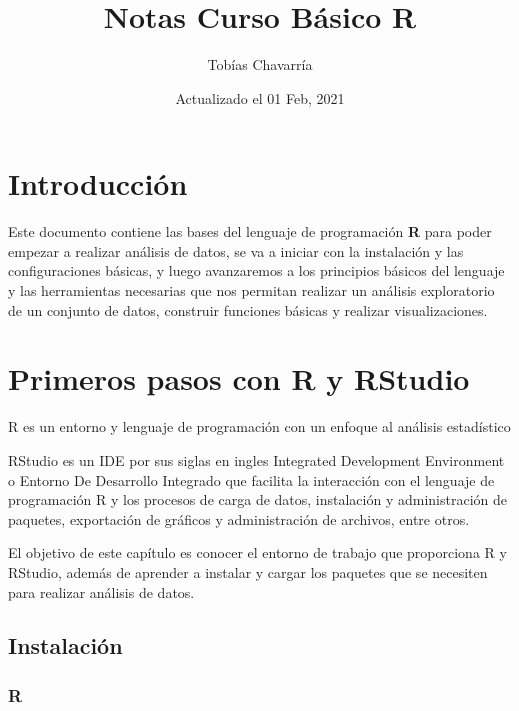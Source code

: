 \documentclass[
  12pt,
]{book}
\title{Notas Curso Básico R}
\author{Tobías Chavarría}
\date{Actualizado el 01 Feb, 2021}
\begin{document}
\maketitle

{
\hypersetup{linkcolor=}
\setcounter{tocdepth}{4}
\tableofcontents
}
\hypertarget{introducciuxf3n}{%
\chapter{Introducción}\label{introducciuxf3n}}

Este documento contiene las bases del lenguaje de programación \textbf{R} para poder
empezar a realizar análisis de datos, se va a iniciar con la instalación y las
configuraciones básicas, y luego avanzaremos a los principios básicos del
lenguaje y las herramientas necesarias que nos permitan realizar un análisis
exploratorio de un conjunto de datos, construir funciones básicas y realizar visualizaciones.

\hypertarget{primeros-pasos-con-r-y-rstudio}{%
\chapter{\texorpdfstring{\textbf{Primeros pasos con R y RStudio}}{Primeros pasos con R y RStudio}}\label{primeros-pasos-con-r-y-rstudio}}

R es un entorno y lenguaje de programación con un enfoque al análisis estadístico

RStudio es un IDE por sus siglas en ingles Integrated Development Environment o Entorno De Desarrollo Integrado que facilita la interacción con el lenguaje de programación R y los procesos de carga de datos, instalación y administración de paquetes, exportación de gráficos y administración de archivos, entre otros.

El objetivo de este capítulo es conocer el entorno de trabajo que proporciona R y RStudio, además de aprender a instalar y cargar los paquetes que se necesiten para realizar análisis de datos.

\hypertarget{instalaciuxf3n}{%
\section{\texorpdfstring{\textbf{Instalación}}{Instalación}}\label{instalaciuxf3n}}

\hypertarget{r}{%
\subsection{\texorpdfstring{\textbf{R}}{R}}\label{r}}
\end{document}
